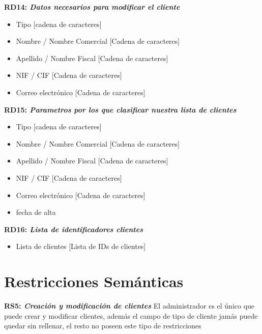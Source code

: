 \documentclass[paper=a4, fontsize=11pt, spanish]{scrartcl}
\begin{document}
\setlength{\parindent}{0em}
\textbf{RD14: \textit{Datos necesarios para modificar el cliente}}
\setlength{\parindent}{2em}
\begin{itemize}
	
	\item Tipo [cadena de caracteres]
	
	\item Nombre / Nombre Comercial [Cadena de caracteres]
	
	\item Apellido / Nombre Fiscal [Cadena de caracteres]
	
	\item NIF / CIF [Cadena de caracteres]
	
	\item Correo electrónico [Cadena de caracteres]
	
\end{itemize}

\setlength{\parindent}{0em}
\textbf{RD15: \textit{Parametros por los que clasificar nuestra lista de clientes}}
\setlength{\parindent}{2em}
\begin{itemize}
	\item Tipo [cadena de caracteres]
	
	\item Nombre / Nombre Comercial [Cadena de caracteres]
	
	\item Apellido / Nombre Fiscal [Cadena de caracteres]
	
	\item NIF / CIF [Cadena de caracteres]
	
	\item Correo electrónico [Cadena de caracteres]
	
	\item fecha de alta
\end{itemize}

\setlength{\parindent}{0em}
\textbf{RD16: \textit{Lista de identificadores clientes}}
\setlength{\parindent}{2em}
\begin{itemize}
	\item Lista de clientes [Lista de IDs de clientes]
\end{itemize}

\section{Restricciones Semánticas}
\setlength{\parindent}{0em}
\textbf{RS5: \textit{Creación y modificación de clientes}}
\setlength{\parindent}{2em}
El administrador es el único que puede crear y modificar clientes, además el campo de tipo de cliente jamás puede quedar sin rellenar, el resto no poseen este tipo de restricciones 
\end{document}
